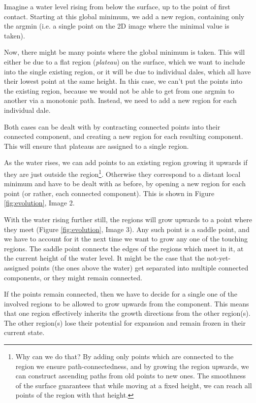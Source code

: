 \documentclass[11pt,twoside,twocolumn,a4paper]{article}
\theoremstyle{plain}
\theoremstyle{definition}
\begin{document}
Imagine a water level rising from below the surface, up to the point of first contact.
Starting at this global minimum, we add a new region, containing only the argmin (i.e. a single point on the 2D image where the minimal value is taken).

Now, there might be many points where the global minimum is taken.
This will either be due to a flat region (\emph{plateau}) on the surface, which we want to include into the single existing region, or it will be due to individual dales, which all have their lowest point at the same height.
In this case, we can't put the points into the existing region, because we would not be able to get from one argmin to another via a monotonic path.
Instead, we need to add a new region for each individual dale.

Both cases can be dealt with by contracting connected points into their connected component, and creating a new region for each resulting component. This will ensure that plateaus are assigned to a single region.

As the water rises, we can add points to an existing region growing it upwards if they are just outside the region\footnote{Why can we do that?
By adding only points which are connected to the region we ensure path-connectedness, and by growing the region upwards, we can construct ascending paths from old points to new ones.
The smoothness of the surface guarantees that while moving at a fixed height, we can reach all points of the region with that height.}.
Otherwise they correspond to a distant local minimum and have to be dealt with as before, by opening a new region for each point (or rather, each connected component).
This is shown in Figure \ref{fig:evolution}, Image 2.

With the water rising further still, the regions will grow upwards to a point where they meet (Figure \ref{fig:evolution}, Image 3).
Any such point is a saddle point, and we have to account for it the next time we want to grow any one of the touching regions.
The saddle point connects the edges of the regions which meet in it, at the current height of the water level.
It might be the case that the not-yet-assigned points (the ones above the water) get separated into multiple connected components, or they might remain connected.

If the points remain connected, then we have to decide for a single one of the involved regions to be allowed to grow upwards from the component.
This means that one region effectively inherits the growth directions from the other region(s).
The other region(s) lose their potential for expansion and remain frozen in their current state.
\end{document}
